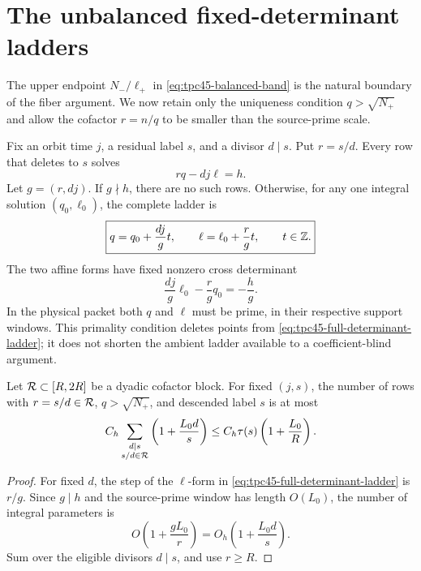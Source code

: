 \section{The unbalanced fixed-determinant ladders}
\label{sec:tpc45-determinant-ladders}

The upper endpoint \(N_-/\ell_+\) in
\eqref{eq:tpc45-balanced-band} is the natural boundary of the fiber
argument.  We now retain only the uniqueness condition
\(q>\sqrt{N_+}\) and allow the cofactor \(r=n/q\) to be smaller than the
source-prime scale.

Fix an orbit time \(j\), a residual label \(s\), and a divisor
\(d\mid s\).  Put \(r=s/d\).  Every row that deletes to \(s\) solves
\begin{equation}
 rq-dj\ell=h.
 \label{eq:tpc45-unbalanced-determinant}
\end{equation}
Let \(g=(r,dj)\).  If \(g\nmid h\), there are no such rows.  Otherwise,
for any one integral solution \((q_0,\ell_0)\), the complete ladder is
\begin{equation}
 \boxed{
 q=q_0+\frac{dj}{g}t,
 \qquad
 \ell=\ell_0+\frac r g t,
 \qquad t\in\mathbb Z.}
 \label{eq:tpc45-full-determinant-ladder}
\end{equation}
The two affine forms have fixed nonzero cross determinant
\begin{equation}
 \frac{dj}{g}\ell_0-\frac r g q_0=-\frac hg.
 \label{eq:tpc45-ladder-cross-determinant}
\end{equation}
In the physical packet both \(q\) and \(\ell\) must be prime, in their
respective support windows.  This primality condition deletes points
from \eqref{eq:tpc45-full-determinant-ladder}; it does not shorten the
ambient ladder available to a coefficient-blind argument.

\begin{proposition}
\label{prop:tpc45-unbalanced-fiber-capacity}
Let \(\mathcal R\subset[R,2R]\) be a dyadic cofactor block.  For fixed
\((j,s)\), the number of rows with \(r=s/d\in\mathcal R\),
\(q>\sqrt{N_+}\), and descended label \(s\) is at most
\begin{equation}
 C_h
 \sum_{\substack{d\mid s\\s/d\in\mathcal R}}
 \left(1+\frac{L_0d}{s}\right)
 \le C_h\tau(s)\left(1+\frac{L_0}{R}\right).
 \label{eq:tpc45-unbalanced-fiber-bound}
\end{equation}
\end{proposition}

\begin{proof}
For fixed \(d\), the step of the \(\ell\)-form in
\eqref{eq:tpc45-full-determinant-ladder} is \(r/g\).  Since
\(g\mid h\) and the source-prime window has length \(O(L_0)\), the
number of integral parameters is
\[
 O\!\left(1+\frac{gL_0}{r}\right)
 =O_h\!\left(1+\frac{L_0d}{s}\right).
\]
Sum over the eligible divisors \(d\mid s\), and use \(r\ge R\).
\end{proof}

